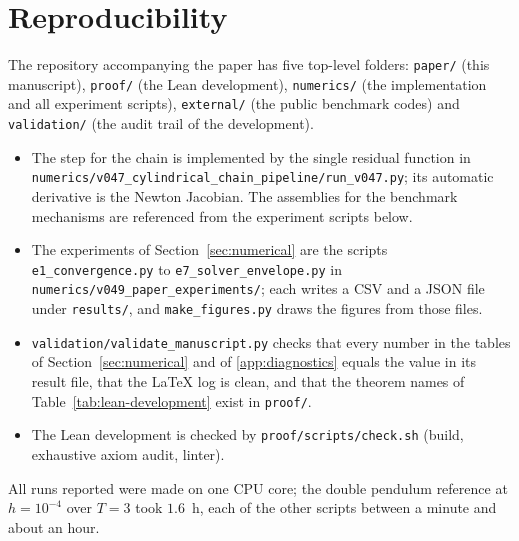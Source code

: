 \section{Reproducibility}
\label{app:repro}

The repository accompanying the paper has five top-level folders: \texttt{paper/} (this
manuscript), \texttt{proof/} (the Lean development), \texttt{numerics/} (the implementation and all
experiment scripts), \texttt{external/} (the public benchmark codes) and \texttt{validation/} (the
audit trail of the development).
\begin{itemize}
  \item The step for the chain is implemented by the single residual function in
  \texttt{numerics/v047\_cylindrical\_chain\_pipeline/run\_v047.py}; its automatic derivative is the
  Newton Jacobian. The assemblies for the benchmark mechanisms are referenced from the experiment
  scripts below.
  \item The experiments of Section~\ref{sec:numerical} are the scripts \texttt{e1\_convergence.py}
  to \texttt{e7\_solver\_envelope.py} in \texttt{numerics/v049\_paper\_experiments/}; each writes a
  CSV and a JSON file under \texttt{results/}, and \texttt{make\_figures.py} draws the figures from
  those files.
  \item \texttt{validation/validate\_manuscript.py} checks that every number in the tables of
  Section~\ref{sec:numerical} and of \ref{app:diagnostics} equals the value in its result file, that
  the LaTeX log is clean, and that the theorem names of Table~\ref{tab:lean-development} exist in
  \texttt{proof/}.
  \item The Lean development is checked by \texttt{proof/scripts/check.sh} (build, exhaustive axiom
  audit, linter).
\end{itemize}
All runs reported were made on one CPU core; the double pendulum reference at $h=10^{-4}$ over
$T=3$ took $1.6$~h, each of the other scripts between a minute and about an hour.
